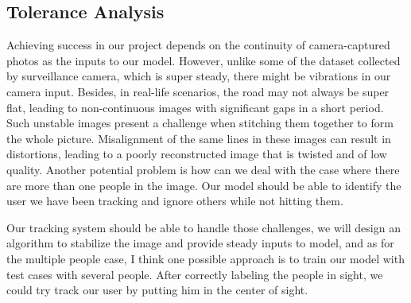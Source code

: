 \subsection{Tolerance Analysis}
Achieving success in our project depends on the continuity of camera-captured photos as the inputs to our model. However, unlike some of the dataset collected by surveillance camera, which is super steady, there might be vibrations in our camera input. Besides, in real-life scenarios, the road may not always be super flat, leading to non-continuous images with significant gaps in a short period. Such unstable images present a challenge when stitching them together to form the whole picture. Misalignment of the same lines in these images can result in distortions, leading to a poorly reconstructed image that is twisted and of low quality.
Another potential problem is how can we deal with the case where there are more than one people in the image. Our model should be able to identify the user we have been tracking and ignore others while not hitting them.

Our tracking system should be able to handle those challenges, we will design an algorithm to stabilize the image and provide steady inputs to model, and as for the multiple people case, I think one possible approach is to train our model with test cases with several people. After correctly labeling the people in sight, we could try track our user by putting him in the center of sight.
